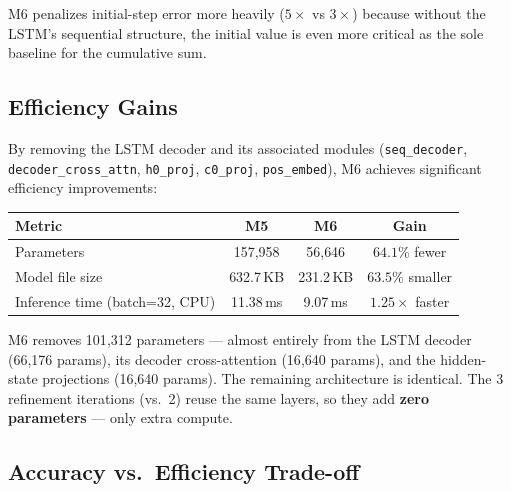 \documentclass[11pt,a4paper]{article}
\begin{document}
M6 penalizes initial-step error more heavily ($5\times$ vs $3\times$) because without the LSTM's sequential structure, the initial value is even more critical as the sole baseline for the cumulative sum.

\subsection{Efficiency Gains}

By removing the LSTM decoder and its associated modules (\texttt{seq\_decoder}, \texttt{decoder\_cross\_attn}, \texttt{h0\_proj}, \texttt{c0\_proj}, \texttt{pos\_embed}), M6 achieves significant efficiency improvements:

\begin{center}
\small
\begin{tabular}{@{}lccc@{}}
\toprule
\textbf{Metric} & \textbf{M5} & \textbf{M6} & \textbf{Gain} \\
\midrule
Parameters & 157{,}958 & 56{,}646 & $\mathbf{64.1\%}$ fewer \\
Model file size & 632.7\,KB & 231.2\,KB & $\mathbf{63.5\%}$ smaller \\
Inference time (batch=32, CPU) & 11.38\,ms & 9.07\,ms & $\mathbf{1.25\times}$ faster \\
\bottomrule
\end{tabular}
\end{center}

M6 removes 101{,}312 parameters --- almost entirely from the LSTM decoder (66{,}176 params), its decoder cross-attention (16{,}640 params), and the hidden-state projections (16{,}640 params). The remaining architecture is identical. The 3 refinement iterations (vs.\ 2) reuse the same layers, so they add \textbf{zero parameters} --- only extra compute.

\subsection{Accuracy vs.\ Efficiency Trade-off}
\end{document}
